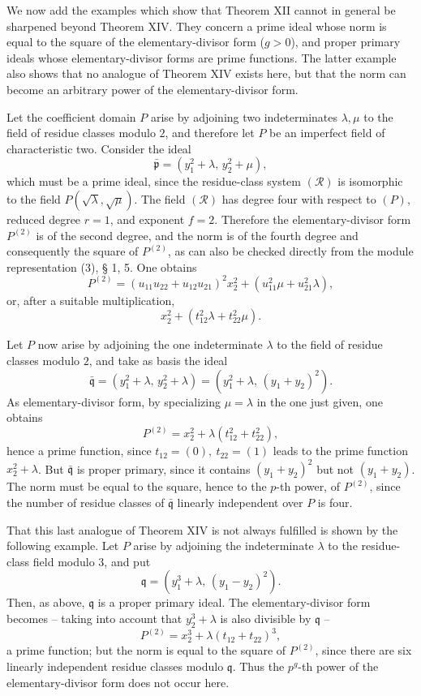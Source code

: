 \documentclass[11pt]{article}
\providecommand{\frakp}{\mathfrak p}
\providecommand{\frakq}{\mathfrak q}
\begin{document}
We now add the examples which show that Theorem XII cannot in general be sharpened beyond Theorem XIV. They concern a prime ideal whose norm is equal to the square of the elementary-divisor form ($g>0$), and proper primary ideals whose elementary-divisor forms are prime functions. The latter example also shows that no analogue of Theorem XIV exists here, but that the norm can become an arbitrary power of the elementary-divisor form.

Let the coefficient domain $P$ arise by adjoining two indeterminates $\lambda,\mu$ to the field of residue classes modulo $2$, and therefore let $P$ be an imperfect field of characteristic two. Consider the ideal
\[
 \bar{\frakp}=(y_1^2+\lambda,\,y_2^2+\mu),
\]
which must be a prime ideal, since the residue-class system $(\mathcal R)$ is isomorphic to the field $P(\sqrt\lambda,\sqrt\mu)$. The field $(\mathcal R)$ has degree four with respect to $(P)$, reduced degree $r=1$, and exponent $f=2$. Therefore the elementary-divisor form $P^{(2)}$ is of the second degree, and the norm is of the fourth degree and consequently the square of $P^{(2)}$, as can also be checked directly from the module representation (3), § 1, 5. One obtains
\[
 P^{(2)}=(u_{11}u_{22}+u_{12}u_{21})^2x_2^2+(u_{11}^2\mu+u_{21}^2\lambda),
\]
or, after a suitable multiplication,
\[
 x_2^2+(t_{12}^2\lambda+t_{22}^2\mu).
\]

Let $P$ now arise by adjoining the one indeterminate $\lambda$ to the field of residue classes modulo $2$, and take as basis the ideal
\[
 \bar{\frakq}=(y_1^2+\lambda,\,y_2^2+\lambda)=(y_1^2+\lambda,\,(y_1+y_2)^2).
\]
As elementary-divisor form, by specializing $\mu=\lambda$ in the one just given, one obtains
\[
 P^{(2)}=x_2^2+\lambda(t_{12}^2+t_{22}^2),
\]
hence a prime function, since $t_{12}=(0),\ t_{22}=(1)$ leads to the prime function $x_2^2+\lambda$. But $\bar{\frakq}$ is proper primary, since it contains $(y_1+y_2)^2$ but not $(y_1+y_2)$. The norm must be equal to the square, hence to the $p$-th power, of $P^{(2)}$, since the number of residue classes of $\bar{\frakq}$ linearly independent over $P$ is four.

That this last analogue of Theorem XIV is not always fulfilled is shown by the following example. Let $P$ arise by adjoining the indeterminate $\lambda$ to the residue-class field modulo $3$, and put
\[
 \frakq=(y_1^3+\lambda,\,(y_1-y_2)^2).
\]
Then, as above, $\frakq$ is a proper primary ideal. The elementary-divisor form becomes -- taking into account that $y_2^3+\lambda$ is also divisible by $\frakq$ --
\[
 P^{(2)}=x_2^3+\lambda(t_{12}+t_{22})^3,
\]
a prime function; but the norm is equal to the square of $P^{(2)}$, since there are six linearly independent residue classes modulo $\frakq$. Thus the $p^g$-th power of the elementary-divisor form does not occur here.
\end{document}
